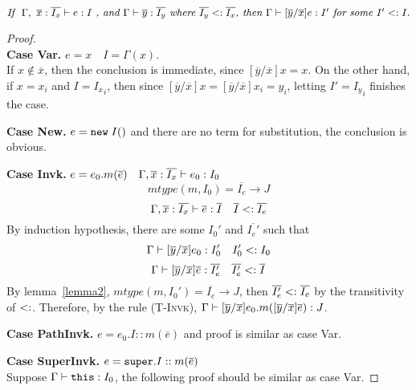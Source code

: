 \begin{lemma}~\label{lemma1}
$\textit{If } \ \judgeewf {\Gamma, \ \overline{x}:\overline{I_x}} { e : I } \textit{ , and }
\judgeewf {\Gamma} {\overline{y}:\overline{I_y}} \textit{ where } \overline{I_y} \subtype \overline{I_x}
\textit{, then } \judgeewf {\Gamma} {[\overline{y}/\overline{x}]e : I'} \textit{ for some } I' \subtype I.
$

\begin{proof}~\\
\noindent \textbf{Case Var.}
$ e = x \quad I = \Gamma(x) $. \\
If $x \notin \overline{x}$, then the conclusion is immediate, since $[\overline{y}/\overline{x}]x = x$.
On the other hand, if $x = x_i$ and $I = {I_x}_i$, then since $[\overline{y}/\overline{x}]x = [\overline{y}/\overline{x}]x_i = y_i$,
letting $I' = {I_y}_i$ finishes the case.

\noindent \textbf{Case New.}
$e = \texttt{new} \; I()$ and there are no term for substitution, the conclusion is obvious.

\noindent \textbf{Case Invk.}
$ e = e_0.m(\overline{e}) \quad
  \Gamma, \overline{x}:\overline{I_x} \; {\vdash} \; e_0 : I_0 $
$$ mtype(m, I_0) = \overline{I_e} \rightarrow J $$
$$ \Gamma, \overline{x}:\overline{I_x} \; {\vdash} \; \overline{e}:\overline{I} \quad
    \overline{I} <: \overline{I_e} $$
By induction hypothesis, there are some $I_0'$ and $\overline{I_e'}$ such that
    $$ \Gamma \; {\vdash} \; [\overline{y}/\overline{x}]e_0 : I_0' \quad 
        I_0' <: I_0 $$
    $$ \Gamma \; {\vdash} \; [\overline{y}/\overline{x}]\overline{e} : \overline{I_e'} \quad  
        \overline{I_e'} <: \overline{I}$$    
By lemma~\ref{lemma2}, 
    $mtype(m, I_0') = \overline{I_e} \rightarrow J$,
then $\overline{I_e'} <: \overline{I_e}$ by the transitivity of $<:$.
Therefore, by the rule \textsc{(T-Invk)}, 
    $\Gamma \; {\vdash} \; [\overline{y}/\overline{x}]e_0.m([\overline{y}/\overline{x}]\overline{e}) : J$.

\noindent \textbf{Case PathInvk.}
$ e = e_0.I::m(\overline{e}) $ and proof is similar as case Var.

\noindent \textbf{Case SuperInvk.}
$ e = \texttt{super}.I::m(\overline{e}) $ \\
Suppose $\Gamma \; {\vdash} \; \texttt{this} : I_0$, the following proof should be similar as case Var.
\end{proof}

\end{lemma}



